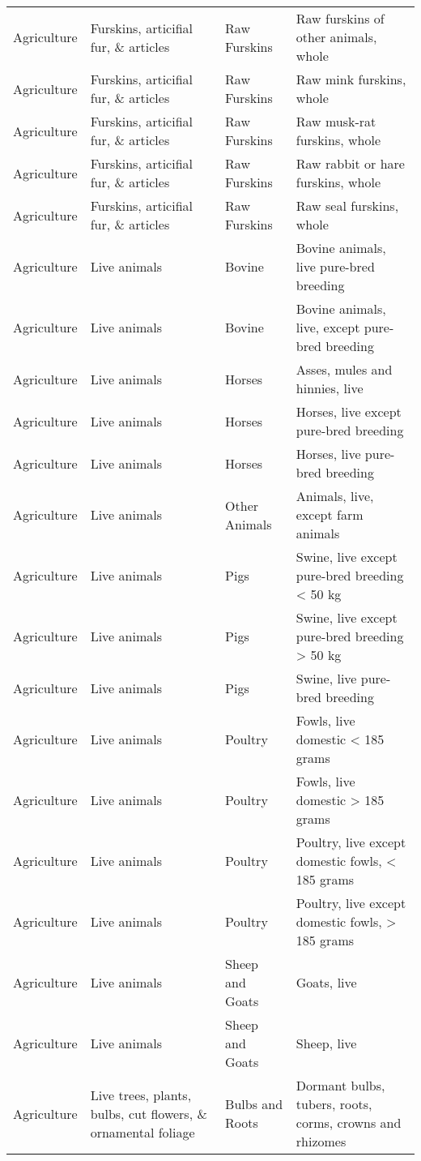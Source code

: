 \begin{appendices}
\begin{xltabular}{\textwidth}{|p{0.07\textwidth}|p{0.28\textwidth}|p{0.24\textwidth}|p{0.31\textwidth}|}
	Agriculture & Furskins, articifial fur, \& articles & Raw Furskins & Raw furskins of other animals, whole \\
	Agriculture & Furskins, articifial fur, \& articles & Raw Furskins & Raw mink furskins, whole \\
	Agriculture & Furskins, articifial fur, \& articles & Raw Furskins & Raw musk-rat furskins, whole \\
	Agriculture & Furskins, articifial fur, \& articles & Raw Furskins & Raw rabbit or hare furskins, whole \\
	Agriculture & Furskins, articifial fur, \& articles & Raw Furskins & Raw seal furskins, whole \\
	Agriculture & Live animals & Bovine & Bovine animals, live pure-bred breeding \\
	Agriculture & Live animals & Bovine & Bovine animals, live, except pure-bred breeding \\
	Agriculture & Live animals & Horses & Asses, mules and hinnies, live \\
	Agriculture & Live animals & Horses & Horses, live except pure-bred breeding \\
	Agriculture & Live animals & Horses & Horses, live pure-bred breeding \\
	Agriculture & Live animals & Other Animals & Animals, live, except farm animals \\
	Agriculture & Live animals & Pigs & Swine, live except pure-bred breeding < 50 kg \\
	Agriculture & Live animals & Pigs & Swine, live except pure-bred breeding > 50 kg \\
	Agriculture & Live animals & Pigs & Swine, live pure-bred breeding \\
	Agriculture & Live animals & Poultry & Fowls, live domestic < 185 grams \\
	Agriculture & Live animals & Poultry & Fowls, live domestic > 185 grams \\
	Agriculture & Live animals & Poultry & Poultry, live except domestic fowls, < 185 grams \\
	Agriculture & Live animals & Poultry & Poultry, live except domestic fowls, > 185 grams \\
	Agriculture & Live animals & Sheep and Goats & Goats, live \\
	Agriculture & Live animals & Sheep and Goats & Sheep, live \\
	Agriculture & Live trees, plants, bulbs, cut flowers, \& ornamental foliage & Bulbs and Roots & Dormant bulbs, tubers, roots, corms, crowns and rhizomes \\

\end{xltabular}
\end{appendices}
